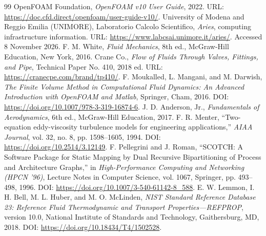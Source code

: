 \documentclass[12pt,a4paper,twoside,openright]{report}
\begin{document}
\tableofcontents
\cleardoublepage
\listoffigures
\cleardoublepage
\listoftables
\cleardoublepage









\appendix


\cleardoublepage
{}
\begin{thebibliography}{99}
    \sloppy %
     OpenFOAM Foundation, \textit{OpenFOAM v10 User Guide}, 2022. URL: \url{https://doc.cfd.direct/openfoam/user-guide-v10/}.
     University of Modena and Reggio Emilia (UNIMORE), Laboratorio Calcolo Scientifico, \textit{Aries}, computing infrastructure information. URL: \url{https://www.labcsai.unimore.it/aries/}. Accessed 8 November 2026.
     F. M. White, \textit{Fluid Mechanics}, 8th ed., McGraw-Hill Education, New York, 2016.
     Crane Co., \textit{Flow of Fluids Through Valves, Fittings, and Pipe}, Technical Paper No. 410, 2018 ed. URL: \url{https://cranecpe.com/brand/tp410/}.
     F. Moukalled, L. Mangani, and M. Darwish, \textit{The Finite Volume Method in Computational Fluid Dynamics: An Advanced Introduction with OpenFOAM and Matlab}, Springer, Cham, 2016. DOI: \url{https://doi.org/10.1007/978-3-319-16874-6}.
     J. D. Anderson, Jr., \textit{Fundamentals of Aerodynamics}, 6th ed., McGraw-Hill Education, 2017.
     F. R. Menter, ``Two-equation eddy-viscosity turbulence models for engineering applications,'' \textit{AIAA Journal}, vol. 32, no. 8, pp. 1598--1605, 1994. DOI: \url{https://doi.org/10.2514/3.12149}.
     F. Pellegrini and J. Roman, ``SCOTCH: A Software Package for Static Mapping by Dual Recursive Bipartitioning of Process and Architecture Graphs,'' in \textit{High-Performance Computing and Networking (HPCN '96)}, Lecture Notes in Computer Science, vol. 1067, Springer, pp. 493--498, 1996. DOI: \url{https://doi.org/10.1007/3-540-61142-8_588}.
     E. W. Lemmon, I. H. Bell, M. L. Huber, and M. O. McLinden, \textit{NIST Standard Reference Database 23: Reference Fluid Thermodynamic and Transport Properties---REFPROP}, version 10.0, National Institute of Standards and Technology, Gaithersburg, MD, 2018. DOI: \url{https://doi.org/10.18434/T4/1502528}.

\end{thebibliography}
\end{document}
